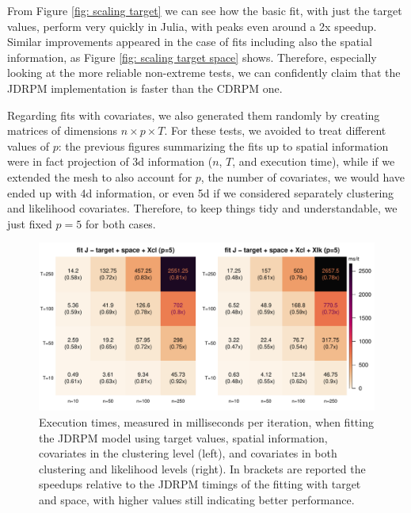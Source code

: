\documentclass[12pt,	%
	a4paper,		%
	twoside,		%
	openright,		%
	titlepage,%
	]{book}
\theoremstyle{definition}
\begin{document}
From Figure \ref{fig: scaling target} we can see how the basic fit, with just the target values, perform very quickly in Julia, with peaks even around a 2x speedup. Similar improvements appeared in the case of fits including also the spatial information, as Figure \ref{fig: scaling target space} shows. Therefore, especially looking at the more reliable non-extreme tests, we can confidently claim that the JDRPM implementation is faster than the CDRPM one.

Regarding fits with covariates, we also generated them randomly by creating matrices of dimensions $n\times p \times T$. For these tests, we avoided to treat different values of $p$: the previous figures summarizing the fits up to spatial information were in fact projection of 3d information ($n$, $T$, and execution time), while if we extended the mesh to also account for $p$, the number of covariates, we would have ended up with 4d information, or even 5d if we considered separately clustering and likelihood covariates. Therefore, to keep things tidy and understandable, we just fixed $p=5$ for both cases.

\begin{figure}[!ht]
    \centering
    \includegraphics[width=1\linewidth]{Testing/Scaling possibilities/target_space_covariates.pdf}
    \caption[Execution times of JDRPM fits, target plus space plus covariates]{Execution times, measured in milliseconds per iteration, when fitting the JDRPM model using target values, spatial information, covariates in the clustering level (left), and covariates in both clustering and likelihood levels (right). In brackets are reported the speedups relative to the JDRPM timings of the fitting with target and space, with higher values still indicating better performance.}
    \label{fig: scaling target space covariates}
\end{figure}
\end{document}
